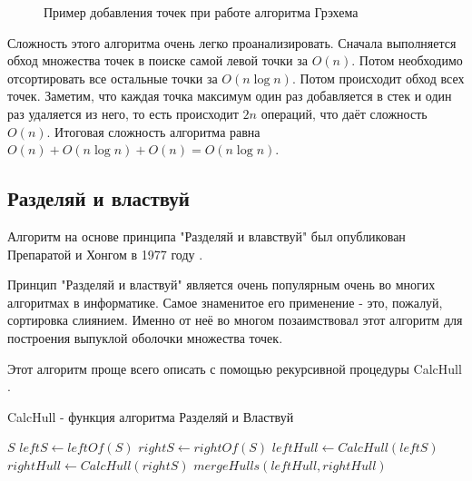 \begin{figure}[H]
	{\centering
		\hfill
		\subbottom[\label{img:graham_1}]{%
			}
		\hfill
		\subbottom[\label{img:graham_2}]{%
			}
		\hfill
		\subbottom[\label{img:graham_3}]{%
			}
		\hfill
	}
	\caption{Пример добавления точек при работе алгоритма Грэхема}
	\label{img:graham}
\end{figure}

Сложность этого алгоритма очень легко проанализировать. Сначала выполняется обход множества точек в поиске самой левой точки за $O(n)$. Потом необходимо отсортировать все остальные точки за $O(n \log n)$. Потом происходит обход всех точек. Заметим, что каждая точка максимум один раз добавляется в стек и один раз удаляется из него, то есть происходит $2n$ операций, что даёт сложность $O(n)$. Итоговая сложность алгоритма равна $O(n) + O(n \log n) + O(n) = O(n \log n)$.

\subsection{Разделяй и властвуй} \label{subsect1_1_3}

Алгоритм на основе принципа "Разделяй и влавствуй" был опубликован Препаратой и Хонгом в 1977 году \cite{preparata1977DivideAndConquer}.

Принцип "Разделяй и властвуй" является очень популярным очень во многих алгоритмах в информатике. Самое знаменитое его применение - это, пожалуй, сортировка слиянием. Именно от неё во многом позаимствовал этот алгоритм для построения выпуклой оболочки множества точек.

Этот алгоритм проще всего описать с помощью рекурсивной процедуры CalcHull \cite{mount2000lecture}.

\begin{algorithm}[H]
	\caption{CalcHull - функция алгоритма Разделяй и Властвуй}
	\begin{algorithmic}[1]
			\Return $S$
		\EndIf
		\State $leftS\gets leftOf(S)$ 
		\State $rightS\gets rightOf(S)$ 
		\State $leftHull\gets CalcHull(leftS)$
		\State $rightHull\gets CalcHull(rightS)$
		\State
		\Return $mergeHulls(leftHull, rightHull)$
		\EndProcedure
	\end{algorithmic}
\end{algorithm}


